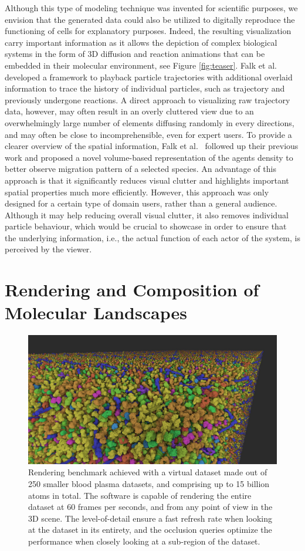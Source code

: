 Although this type of modeling technique was invented for scientific purposes, we envision that the generated data could also be utilized to digitally reproduce the functioning of cells for explanatory purposes.
Indeed, the resulting visualization carry important information as it allows the depiction of complex biological systems in the form of 3D diffusion and reaction animations that can be embedded in their molecular environment, see Figure \ref{fig:teaser}.
Falk et al.~\cite{falk2009visualization} developed a framework to playback particle trajectories with additional overlaid information to trace the history of individual particles, such as trajectory and previously undergone reactions.
A direct approach to visualizing raw trajectory data, however, may often result in an overly cluttered view due to an overwhelmingly large number of elements diffusing randomly in every directions, and may often be close to incomprehensible, even for expert users.
To provide a clearer overview of the spatial information, Falk et al.~\cite{falk20103d} followed up their previous work and proposed a novel volume-based representation of the agents density to better observe migration pattern of a selected species.
An advantage of this approach is that it significantly reduces visual clutter and highlights important spatial properties much more efficiently.
However, this approach was only designed for a certain type of domain users, rather than a general audience.
Although it may help reducing overall visual clutter, it also removes individual particle behaviour, which would be crucial to showcase in order to ensure that the underlying information, i.e., the actual function of each actor of the system, is perceived by the viewer.

\section{Rendering and Composition of Molecular Landscapes}
\label{sec:section3}

\begin{figure}
	\centering
	\includegraphics[width=0.85\linewidth]{"graphics/large_scene"}
	\caption{Rendering benchmark achieved with a virtual dataset made out of 250 smaller blood plasma datasets, and comprising up to 15 billion atoms in total. The software is capable of rendering the entire dataset at 60 frames per seconds, and from any point of view in the 3D scene. The level-of-detail ensure a fast refresh rate when looking at the dataset in its entirety, and the occlusion queries optimize the performance when closely looking at a sub-region of the dataset.}
	\label{fig:unity-2015-06-22-01-20-37-65}
\end{figure}


